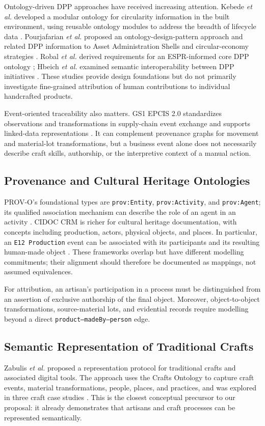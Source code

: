 \documentclass[conference]{IEEEtran}
\begin{document}
Ontology-driven DPP approaches have received increasing attention. Kebede \emph{et al.} developed a modular ontology for circularity information in the built environment, using reusable ontology modules to address the breadth of lifecycle data \cite{kebede2024modular}. Pourjafarian \emph{et al.} proposed an ontology-design-pattern approach and related DPP information to Asset Administration Shells and circular-economy strategies \cite{pourjafarian2025odp}. Robal \emph{et al.} derived requirements for an ESPR-informed core DPP ontology \cite{robal2026requirements}; Hbeich \emph{et al.} examined semantic interoperability between DPP initiatives \cite{hbeich2026interop}. These studies provide design foundations but do not primarily investigate fine-grained attribution of human contributions to individual handcrafted products.

Event-oriented traceability also matters. GS1 EPCIS 2.0 standardizes observations and transformations in supply-chain event exchange and supports linked-data representations \cite{gs12022epcis}. It can complement provenance graphs for movement and material-lot transformations, but a business event alone does not necessarily describe craft skills, authorship, or the interpretive context of a manual action.

\subsection{Provenance and Cultural Heritage Ontologies}
PROV-O's foundational types are \texttt{prov:Entity}, \texttt{prov:Activity}, and \texttt{prov:Agent}; its qualified association mechanism can describe the role of an agent in an activity \cite{w3c2013prov}. CIDOC CRM is richer for cultural heritage documentation, with concepts including production, actors, physical objects, and places. In particular, an \texttt{E12 Production} event can be associated with its participants and its resulting human-made object \cite{cidoc2024crm}. These frameworks overlap but have different modelling commitments; their alignment should therefore be documented as mappings, not assumed equivalences.

For attribution, an artisan's participation in a process must be distinguished from an assertion of exclusive authorship of the final object. Moreover, object-to-object transformations, source-material lots, and evidential records require modelling beyond a direct \texttt{product--madeBy--person} edge.

\subsection{Semantic Representation of Traditional Crafts}
Zabulis \emph{et al.} proposed a representation protocol for traditional crafts and associated digital tools. The approach uses the Crafts Ontology to capture craft events, material transformations, people, places, and practices, and was explored in three craft case studies \cite{zabulis2022representation}. This is the closest conceptual precursor to our proposal: it already demonstrates that artisans and craft processes can be represented semantically.
\end{document}
